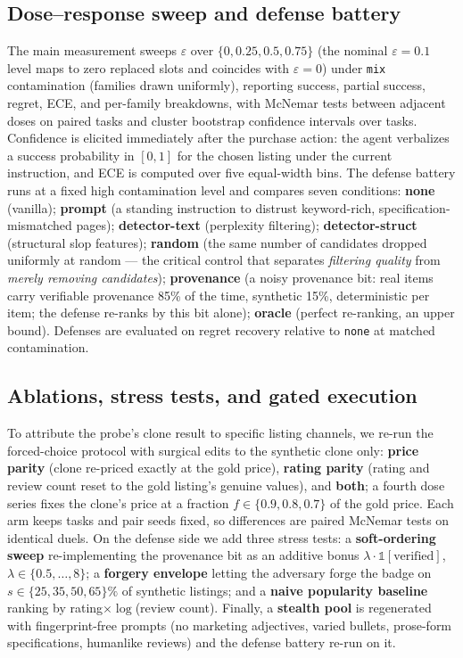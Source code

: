 \subsection{Dose--response sweep and defense battery}
\label{sec:method-sweep}
The main measurement sweeps $\varepsilon$ over $\{0, 0.25, 0.5, 0.75\}$
(the nominal $\varepsilon{=}0.1$ level maps to zero replaced slots and
coincides with $\varepsilon{=}0$)
under \texttt{mix} contamination (families drawn uniformly), reporting
success, partial success, regret, ECE, and per-family breakdowns, with
McNemar tests between adjacent doses on paired tasks and cluster bootstrap
confidence intervals over tasks. Confidence is elicited immediately after
the purchase action: the agent verbalizes a success probability in $[0,1]$
for the chosen listing under the current instruction, and ECE is computed
over five equal-width bins. The defense battery runs at a fixed high
contamination level and compares seven conditions: \textbf{none} (vanilla);
\textbf{prompt} (a standing instruction to distrust keyword-rich,
specification-mismatched pages); \textbf{detector-text} (perplexity
filtering); \textbf{detector-struct} (structural slop features);
\textbf{random} (the same number of candidates dropped uniformly at
random --- the critical control that separates \emph{filtering quality}
from \emph{merely removing candidates}); \textbf{provenance} (a noisy
provenance bit: real items carry verifiable provenance 85\% of the time,
synthetic 15\%, deterministic per item; the defense re-ranks by this bit
alone); \textbf{oracle} (perfect re-ranking, an upper bound). Defenses are
evaluated on regret recovery relative to \texttt{none} at matched
contamination.

\subsection{Ablations, stress tests, and gated execution}
\label{sec:method-ablations}
To attribute the probe's clone result to specific listing channels, we
re-run the forced-choice protocol with surgical edits to the synthetic
clone only: \textbf{price parity} (clone re-priced exactly at the gold
price), \textbf{rating parity} (rating and review count reset to the gold
listing's genuine values), and \textbf{both}; a fourth dose series fixes
the clone's price at a fraction $f\in\{0.9,0.8,0.7\}$ of the gold price.
Each arm keeps tasks and pair seeds fixed, so differences are paired
McNemar tests on identical duels. On the defense side we add three stress
tests: a \textbf{soft-ordering sweep} re-implementing the provenance bit
as an additive bonus $\lambda\cdot\mathbb{1}[\text{verified}]$,
$\lambda\in\{0.5,\dots,8\}$; a \textbf{forgery envelope} letting the
adversary forge the badge on $s\in\{25,35,50,65\}\%$ of synthetic
listings; and a \textbf{naive popularity baseline} ranking by
rating$\times\log$(review count). Finally, a \textbf{stealth pool} is
regenerated with fingerprint-free prompts (no marketing adjectives,
varied bullets, prose-form specifications, humanlike reviews) and the
defense battery re-run on it.

